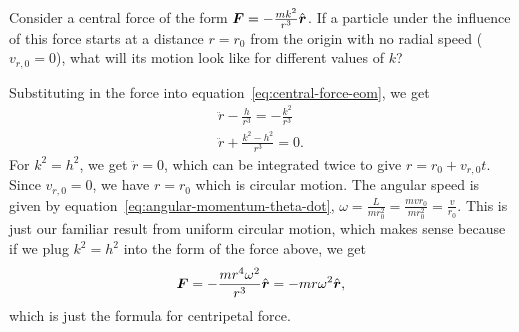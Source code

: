 \documentclass[../classical_mechanics.tex]{subfiles}
\begin{document}
            \begin{example}
                Consider a central force of the form $\boldsymbol{F}=-\frac{mk^2}{r^3}\hat{\boldsymbol{r}}$.
                If a particle under the influence of this force starts at a distance $r=r_0$ from the origin with no radial speed ($v_{r,0}=0$), what will its motion look like for different values of $k$?

                Substituting in the force into equation~\ref{eq:central-force-eom}, we get
                \begin{gather}
                    \ddot{r}-\frac{h}{r^3}=-\frac{k^2}{r^3}\\
                    \ddot{r}+\frac{k^2-h^2}{r^3}=0.
                \end{gather}
                For $k^2=h^2$, we get $\ddot{r}=0$, which can be integrated twice to give $r=r_0+v_{r,0}t$.
                Since $v_{r,0}=0$, we have $r=r_0$ which is circular motion.
                The angular speed is given by equation~\ref{eq:angular-momentum-theta-dot}, $\omega=\frac{L}{mr_0^2}=\frac{mvr_0}{mr_0^2}=\frac{v}{r_0}$.
                This is just our familiar result from uniform circular motion, which makes sense because if we plug $k^2=h^2$ into the form of the force above, we get
                \begin{equation}
                    \boldsymbol{F}=-\frac{mr^4\omega^2}{r^3}\hat{\boldsymbol{r}}=-mr\omega^2\hat{\boldsymbol{r}},
                \end{equation}
                which is just the formula for centripetal force.


\end{example}
\end{document}
